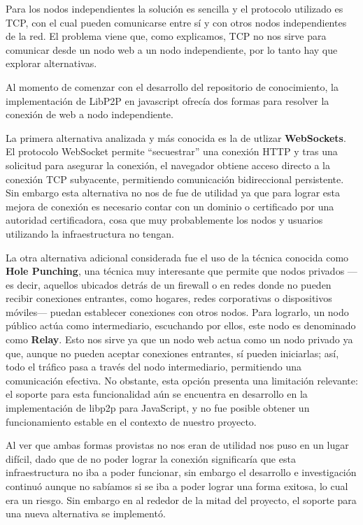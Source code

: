 Para los nodos independientes la solución es sencilla y el protocolo utilizado es TCP, con el cual pueden comunicarse entre sí y con otros nodos independientes de la red. El problema viene que, como explicamos, TCP no nos sirve para comunicar desde un nodo web a un nodo independiente, por lo tanto hay que explorar alternativas.

Al momento de comenzar con el desarrollo del repositorio de conocimiento, la implementación de LibP2P en javascript ofrecía dos formas para resolver la conexión de web a nodo independiente.

La primera alternativa analizada y más conocida es la de utlizar \textbf{WebSockets}\cite{websocket}. El protocolo WebSocket permite “secuestrar” una conexión HTTP y tras una solicitud para asegurar la conexión, el navegador obtiene acceso directo a la conexión TCP subyacente, permitiendo comunicación bidireccional persistente. Sin embargo esta alternativa no nos de fue de utilidad ya que para lograr esta mejora de conexión es necesario contar con un dominio o certificado por una autoridad certificadora, cosa que muy probablemente los nodos y usuarios utilizando la infraestructura no tengan.

La otra alternativa adicional considerada fue el uso de la técnica conocida como \textbf{Hole Punching}\cite{hole-punching}, una técnica muy interesante que permite que nodos privados —es decir, aquellos ubicados detrás de un firewall o en redes donde no pueden recibir conexiones entrantes, como hogares, redes corporativas o dispositivos móviles— puedan establecer conexiones con otros nodos. Para lograrlo, un nodo público actúa como intermediario, escuchando por ellos, este nodo es denominado como \textbf{Relay}. Esto nos sirve ya que un nodo web actua como un nodo privado ya que, aunque no pueden aceptar conexiones entrantes, sí pueden iniciarlas; así, todo el tráfico pasa a través del nodo intermediario, permitiendo una comunicación efectiva. No obstante, esta opción presenta una limitación relevante: el soporte para esta funcionalidad aún se encuentra en desarrollo en la implementación de libp2p para JavaScript, y no fue posible obtener un funcionamiento estable en el contexto de nuestro proyecto.

Al ver que ambas formas provistas no nos eran de utilidad nos puso en un lugar difícil, dado que de no poder lograr la conexión significaría que esta infraestructura no iba a poder funcionar, sin embargo el desarrollo e investigación continuó aunque no sabíamos si se iba a poder lograr una forma exitosa, lo cual era un riesgo. Sin embargo en al rededor de la mitad del proyecto, el soporte para una nueva alternativa se implementó.

